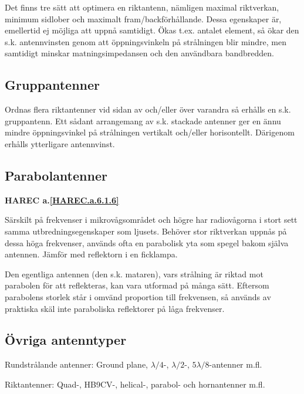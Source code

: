 Det finns tre sätt att optimera en riktantenn, nämligen maximal
riktverkan, minimum sidlober och maximalt fram/backförhållande. Dessa
egenskaper är, emellertid ej möjliga att uppnå samtidigt. Ökas t.ex.
antalet element, så ökar den s.k. antennvinsten genom att
öppningsvinkeln på strålningen blir mindre, men samtidigt minskar
matningsimpedansen och den användbara bandbredden.



\subsection{Gruppantenner}

Ordnas flera riktantenner vid sidan av och/eller över varandra så
erhålls en s.k. gruppantenn. Ett sådant arrangemang av s.k. stackade
antenner ger en ännu mindre öppningsvinkel på strålningen vertikalt
och/eller horisontellt. Därigenom erhålls ytterligare antennvinst.

\subsection{Parabolantenner}
\textbf{
HAREC a.\ref{HAREC.a.6.1.6}\label{myHAREC.a.6.1.6}
}

Särskilt på frekvenser i mikrovågsområdet och högre har radiovågorna i
stort sett samma utbredningsegenskaper som ljusets.  Behöver stor
riktverkan uppnås på dessa höga frekvenser, används ofta en parabolisk
yta som spegel bakom själva antennen.  Jämför med reflektorn i en
ficklampa.

Den egentliga antennen (den s.k. mataren), vars strålning är riktad
mot parabolen för att reflekteras, kan vara utformad på många
sätt. Eftersom parabolens storlek står i omvänd proportion till
frekvensen, så används av praktiska skäl inte paraboliska reflektorer
på låga frekvenser.

\subsection{Övriga antenntyper}

Rundstrålande antenner: Ground plane, \(\lambda/4\)-, \(\lambda/2\)-,
\(5\lambda/8\)-antenner m.fl.

Riktantenner: Quad-, HB9CV-, helical-, parabol- och hornantenner m.fl.
